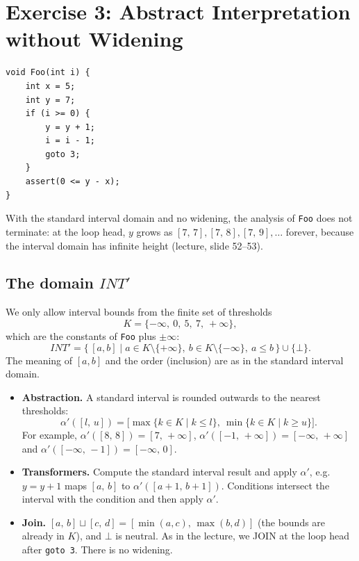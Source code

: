 \documentclass[11pt,a4paper]{article}
\newcommand{\itv}[2]{[#1,\,#2]}
\newcommand{\ninf}{-\infty}
\newcommand{\pinf}{+\infty}
\newcommand{\INTp}{\mathit{INT}'}
\begin{document}
\newpage
\section*{Exercise 3: Abstract Interpretation without Widening}

\begin{lstlisting}
void Foo(int i) {
    int x = 5;
    int y = 7;
    if (i >= 0) {
        y = y + 1;
        i = i - 1;
        goto 3;
    }
    assert(0 <= y - x);
}
\end{lstlisting}

With the standard interval domain and no widening, the analysis of \texttt{Foo} does not
terminate: at the loop head, $y$ grows as $\itv{7}{7}, \itv{7}{8}, \itv{7}{9}, \dots$
forever, because the interval domain has infinite height (lecture, slide 52--53).

\subsection*{The domain $\INTp$}

We only allow interval bounds from the finite set of thresholds
\[
  K = \{\ninf,\ 0,\ 5,\ 7,\ \pinf\},
\]
which are the constants of \texttt{Foo} plus $\pm\infty$:
\[
  \INTp = \{\, [a,b] \mid a \in K \setminus \{\pinf\},\ b \in K \setminus \{\ninf\},\ a \le b \,\} \cup \{\bot\}.
\]
The meaning of $[a,b]$ and the order (inclusion) are as in the standard interval domain.

\begin{itemize}
  \item \textbf{Abstraction.} A standard interval is rounded outwards to the nearest thresholds:
        \[
          \alpha'(\itv{l}{u}) = \big[\max\{k \in K \mid k \le l\},\ \min\{k \in K \mid k \ge u\}\big].
        \]
        For example, $\alpha'(\itv{8}{8}) = \itv{7}{\pinf}$,
        $\alpha'(\itv{-1}{\pinf}) = \itv{\ninf}{\pinf}$ and
        $\alpha'(\itv{\ninf}{-1}) = \itv{\ninf}{0}$.
  \item \textbf{Transformers.} Compute the standard interval result and apply $\alpha'$,
        e.g.\ $y = y + 1$ maps $\itv{a}{b}$ to $\alpha'(\itv{a+1}{b+1})$. Conditions intersect
        the interval with the condition and then apply $\alpha'$.
  \item \textbf{Join.} $\itv{a}{b} \sqcup \itv{c}{d} = \itv{\min(a,c)}{\max(b,d)}$ (the bounds
        are already in $K$), and $\bot$ is neutral. As in the lecture, we JOIN at the loop
        head after \texttt{goto 3}. There is no widening.
\end{itemize}
\end{document}
